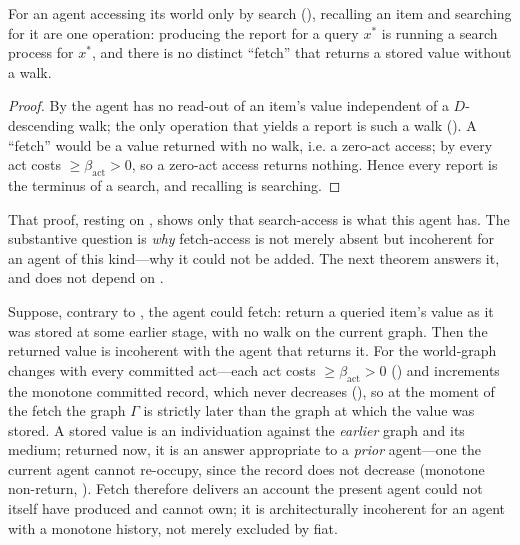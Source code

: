 \documentclass[11pt,twocolumn,a4paper]{article}
\newcommand{\Gph}{\Gamma}
\newcommand{\flo}{\beta}
\newcommand{\dem}{D}
\begin{document}
\begin{theorem}
\label{thm:recsearch}
For an agent accessing its world only by search (),
recalling an item and searching for it are one operation: producing the
report for a query $x^\ast$ is running a search process for $x^\ast$, and
there is no distinct ``fetch'' that returns a stored value without a walk.
\end{theorem}

\begin{proof}
By  the agent has no read-out of an item's value
independent of a $\dem$-descending walk; the only operation that yields a
report is such a walk (). A ``fetch'' would be a
value returned with no walk, i.e. a zero-act access; by 
every act costs $\ge\flo_{\mathrm{act}}>0$, so a zero-act access returns
nothing. Hence every report is the terminus of a search, and recalling is
searching.
\end{proof}

That proof, resting on , shows only that search-access
is what this agent has. The substantive question is \emph{why} fetch-access
is not merely absent but incoherent for an agent of this kind---why it could
not be added. The next theorem answers it, and does not depend on
.

\begin{theorem}
\label{thm:fetchincoherent}
Suppose, contrary to , the agent could fetch: return a
queried item's value as it was stored at some earlier stage, with no walk on
the current graph. Then the returned value is incoherent with the agent that
returns it. For the world-graph changes with every committed act---each act
costs $\ge\flo_{\mathrm{act}}>0$ () and increments the
monotone committed record, which never decreases (),
so at the moment of the fetch the graph $\Gph$ is strictly later than the
graph at which the value was stored. A stored value is an individuation against the
\emph{earlier} graph and its medium; returned now, it is an answer
appropriate to a \emph{prior} agent---one the current agent cannot re-occupy,
since the record does not decrease (monotone non-return,
). Fetch therefore delivers an account the present
agent could not itself have produced and cannot own; it is architecturally
incoherent for an agent with a monotone history, not merely excluded by
fiat.
\end{theorem}
\end{document}
